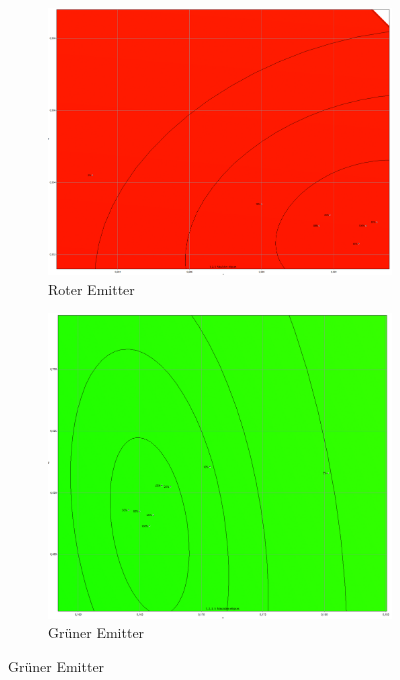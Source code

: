 \documentclass[11pt]{scrartcl}
\begin{document}
\begin{figure}[H]
    \centering
    \begin{subfigure}[b]{.49\textwidth}
        \includegraphics[width=\textwidth]{images/macAdam/led_wash_300Red.png}
        \caption{Roter Emitter}
    \end{subfigure}
    \hfill 
    \begin{subfigure}[b]{.49\textwidth}
        \includegraphics[width=\textwidth]{images/macAdam/led_wash_300Green.png}
        \caption{Grüner Emitter}
    \end{subfigure}

\end{figure}
\end{document}
